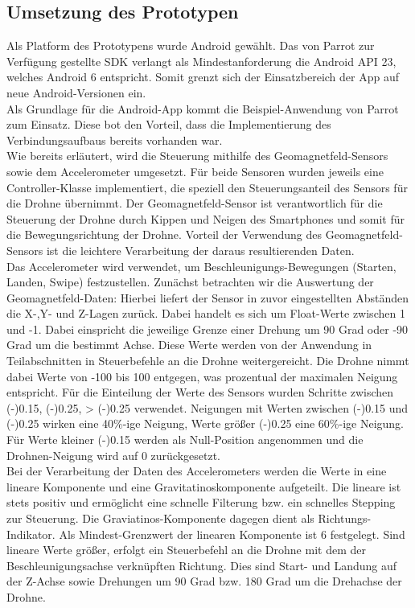 \documentclass{article}
\begin{document}
\subsection{Umsetzung des Prototypen}
Als Platform des Prototypens wurde Android gewählt. Das von Parrot zur Verfügung gestellte SDK verlangt als Mindestanforderung die Android API 23, welches Android 6 entspricht.
Somit grenzt sich der Einsatzbereich der App auf neue Android-Versionen ein.\\
Als Grundlage für die Android-App kommt die Beispiel-Anwendung von Parrot zum Einsatz. Diese bot den Vorteil, dass die Implementierung des Verbindungsaufbaus bereits vorhanden war.
\\
Wie bereits erläutert, wird die Steuerung mithilfe des Geomagnetfeld-Sensors sowie dem Accelerometer umgesetzt. Für beide Sensoren wurden jeweils eine Controller-Klasse implementiert,
die speziell den Steuerungsanteil des Sensors für die Drohne übernimmt.
Der Geomagnetfeld-Sensor ist verantwortlich für die Steuerung der Drohne durch Kippen und Neigen des Smartphones und somit für die Bewegungsrichtung der Drohne.
Vorteil der Verwendung des Geomagnetfeld-Sensors ist die leichtere Verarbeitung der daraus resultierenden Daten.\\
Das Accelerometer wird verwendet, um Beschleunigungs-Bewegungen (Starten, Landen, Swipe) festzustellen.
Zunächst betrachten wir die Auswertung der Geomagnetfeld-Daten: Hierbei liefert der Sensor in zuvor eingestellten Abständen die X-,Y- und Z-Lagen zurück. Dabei handelt es sich um Float-Werte
zwischen 1 und -1. Dabei einspricht die jeweilige Grenze einer Drehung um 90 Grad oder -90 Grad um die bestimmt Achse. Diese Werte werden von der Anwendung in Teilabschnitten in Steuerbefehle an die
Drohne weitergereicht. Die Drohne nimmt dabei Werte von -100 bis 100 entgegen, was prozentual der maximalen Neigung entspricht. Für die Einteilung der Werte des Sensors wurden Schritte zwischen
(-)0.15, (-)0.25, > (-)0.25 verwendet. Neigungen mit Werten zwischen (-)0.15 und (-)0.25 wirken eine 40\%-ige Neigung, Werte größer (-)0.25 eine 60\%-ige Neigung. Für Werte kleiner
(-)0.15 werden als Null-Position angenommen und die Drohnen-Neigung wird auf 0 zurückgesetzt.\\
Bei der Verarbeitung der Daten des Accelerometers werden die Werte in eine lineare Komponente und eine Gravitatinoskomponente aufgeteilt. Die lineare ist stets positiv und ermöglicht eine
schnelle Filterung bzw. ein schnelles Stepping zur Steuerung. Die Graviatinos-Komponente dagegen dient als Richtungs-Indikator.
Als Mindest-Grenzwert der linearen Komponente ist 6 festgelegt. Sind lineare Werte größer, erfolgt ein Steuerbefehl an die Drohne mit dem der Beschleunigungsachse verknüpften Richtung.
Dies sind Start- und Landung auf der Z-Achse sowie Drehungen um 90 Grad bzw. 180 Grad um die Drehachse der Drohne.
\end{document}
